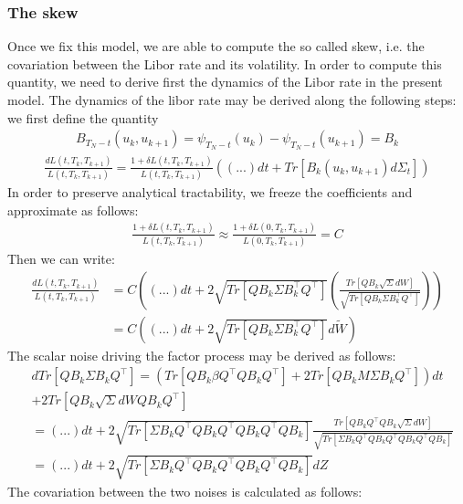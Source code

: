 \subsubsection{The skew}
Once we fix this model, we are able to compute the so called skew, i.e. the covariation between the Libor rate and its volatility. In order to compute this quantity, we need to derive first the dynamics of the Libor rate in the present model.
The dynamics of the libor rate may be derived along the following steps: we first define the quantity
\begin{align}
B_{T_N-t}(u_k,u_{k+1})=\psi_{T_N-t}(u_k)-\psi_{T_N-t}(u_{k+1})=B_k
\end{align}
\begin{align}
\frac{dL(t,T_k,T_{k+1})}{L(t,T_k,T_{k+1})}=\frac{1+\delta L(t,T_k,T_{k+1})}{L(t,T_k,T_{k+1})}\left((...)dt+Tr\left[B_k(u_k,u_{k+1})d\Sigma_t\right]\right)
\end{align}
In order to preserve analytical tractability, we freeze the coefficients and approximate as follows:
\begin{align}
\frac{1+\delta L(t,T_k,T_{k+1})}{L(t,T_k,T_{k+1})}\approx \frac{1+\delta L(0,T_k,T_{k+1})}{L(0,T_k,T_{k+1})}=C
\end{align}
Then we can write:
\begin{align}
\frac{dL(t,T_k,T_{k+1})}{L(t,T_k,T_{k+1})}&=C\left((...)dt+2\sqrt{Tr\left[QB_k\Sigma B_k^{\top}Q^{\top}\right]}\left(\frac{Tr\left[QB_k\sqrt{\Sigma}dW\right]}{\sqrt{Tr\left[QB_k\Sigma B_k^{\top}Q^{\top}\right]}}\right)\right)\nonumber\\
&=C\left((...)dt+2\sqrt{Tr\left[QB_k\Sigma B_k^{\top}Q^{\top}\right]}d\tilde{W}\right)
\end{align}
The scalar noise driving the factor process may be derived as follows:
\begin{align}
&dTr\left[QB_k\Sigma B_kQ^{\top}\right]=\left(Tr\left[QB_k\beta Q^{\top}QB_kQ^{\top}\right]+2Tr\left[QB_kM\Sigma B_kQ^{\top}\right]\right)dt\nonumber\\
&+2Tr\left[QB_k\sqrt{\Sigma}dWQB_kQ^{\top}\right]\nonumber\\
&=(...)dt+2\sqrt{Tr\left[\Sigma B_kQ^{\top}QB_kQ^{\top}QB_kQ^{\top}QB_k\right]}\frac{Tr\left[QB_kQ^{\top}QB_k\sqrt{\Sigma}dW\right]}{\sqrt{Tr\left[\Sigma B_kQ^{\top}QB_kQ^{\top}QB_kQ^{\top}QB_k \right]}}\nonumber\\
&=(...)dt+2\sqrt{Tr\left[\Sigma B_kQ^{\top}QB_kQ^{\top}QB_kQ^{\top}QB_k\right]}dZ
\end{align}
The covariation between the two noises is calculated as follows:
